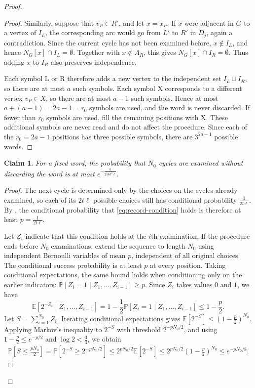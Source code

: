 \documentclass[11pt,a4paper]{article}
\newtheorem{claim}{Claim}
\theoremstyle{remark}
\numberwithin{equation}{section}
\newcommand{\Prob}{\mathbb{P}}
\newcommand{\E}{\mathbb{E}}
\begin{document}
\begin{proof}
\begin{proof}
			Similarly, suppose that $v_P\in R'$, and let $x=x_P$. If $x$ were adjacent
			in $G$ to a vertex of $I_L$, the corresponding arc would go from $L'$ to
			$R'$ in $D_j$, again a contradiction. Since the current cycle has not been examined before,
			$x\notin I_L$, and hence $N_G[x]\cap I_L=\emptyset$. Together with
			$x\notin A_R$, this gives $N_G[x]\cap I_R=\emptyset$. Thus adding $x$ to
			$I_R$ also preserves independence.
			
			Each symbol $\mathrm{L}$ or $\mathrm{R}$ therefore adds a new vertex to the
			independent set $I_L\cup I_R$, so there are at most $a$ such symbols.
			Each symbol $\mathrm{X}$ corresponds to a different vertex $v_P\in X$, so
			there are at most $a-1$ such symbols. Hence at most
			$a+(a-1)=2a-1=r_0$ symbols are used, and the word is never discarded.
			If fewer than $r_0$ symbols are used, fill the remaining positions with
			$\mathrm{X}$. These additional symbols are never read and do not affect
			the procedure. Since each of the $r_0=2a-1$ positions has three possible
			symbols, there are $3^{2a-1}$ possible words.
		\end{proof}
		
		\begin{claim}\label{cl:overflow}
			For a fixed word, the probability that $N_0$ cycles are examined without discarding
			the word is at most $e^{-\frac{h}{256t^2\ell}}$.
		\end{claim}
		\begin{proof}
			The next cycle is determined only by the choices on the
			cycles already examined, so each of its $2t\ell$ possible
			choices still has conditional probability $\frac{1}{2t\ell}$.
			By , the conditional probability that
			\eqref{eq:record-condition} holds is therefore at least
			$p=\frac{1}{2t\ell}$.
			
			Let $Z_i$ indicate that this condition holds at the $i$th
			examination.
			If the procedure ends before $N_0$ examinations, extend
			the sequence to length $N_0$ using independent Bernoulli
			variables of mean $p$, independent of all original choices.
			The conditional success probability is at least $p$ at
			every position.
			Taking conditional expectations, the same bound holds
			when conditioning only on the earlier indicators:
			$
			\Prob[Z_i=1\mid Z_1,\ldots,Z_{i-1}]\ge p.
			$
			Since $Z_i$ takes values $0$ and $1$, we have
			\[
			\E[2^{-Z_i}\mid Z_1,\ldots,Z_{i-1}]
			=1-\frac12\Prob[Z_i=1\mid Z_1,\ldots,Z_{i-1}]
			\le1-\frac p2.
			\]
			Let $S=\sum_{i=1}^{N_0}Z_i$.
			Iterating conditional expectations gives
			$
			\E[2^{-S}]\le(1-\frac p2)^{N_0}.
			$
			Applying Markov's inequality to $2^{-S}$ with threshold
			$2^{-pN_0/2}$, and using $1-\frac{p}{2}\le e^{-p/2}$ and
			$\log 2<\frac{3}{4}$, we obtain
			\[
			\begin{aligned}
				\Prob\!\left[S\le\frac{pN_0}{2}\right]
				=\Prob\!\left[2^{-S}\ge2^{-pN_0/2}\right]
				\le2^{pN_0/2}\E[2^{-S}]
				\le2^{pN_0/2}\left(1-\frac p2\right)^{N_0}
				\le e^{-pN_0/8}.
			\end{aligned}
			\]
			

\end{proof}
\end{proof}
\end{document}
